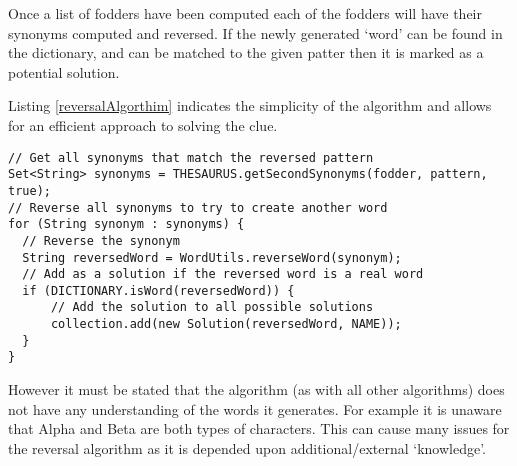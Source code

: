 Once a list of fodders have been computed each of the fodders will have their
synonyms computed and reversed. If the newly generated `word' can be found in 
the dictionary, and can be matched to the given patter then it is marked as a 
potential solution.

Listing \ref{reversalAlgorthim} indicates the simplicity of the algorithm and 
allows for an efficient approach to solving the clue.

\begin{lstlisting}[caption={Core reversal algorthim deducing possbile solutions},
                   label=reversalAlgorthim]  
// Get all synonyms that match the reversed pattern
Set<String> synonyms = THESAURUS.getSecondSynonyms(fodder, pattern, true);
// Reverse all synonyms to try to create another word
for (String synonym : synonyms) {
  // Reverse the synonym
  String reversedWord = WordUtils.reverseWord(synonym);
  // Add as a solution if the reversed word is a real word
  if (DICTIONARY.isWord(reversedWord)) {
      // Add the solution to all possible solutions
      collection.add(new Solution(reversedWord, NAME));
  }
}
\end{lstlisting}

However it must be stated that the algorithm (as with all other algorithms) does
not have any understanding of the words it generates. For example it is unaware
that Alpha and Beta are both types of characters. This can cause many issues for
the reversal algorithm as it is depended upon additional/external `knowledge'.
